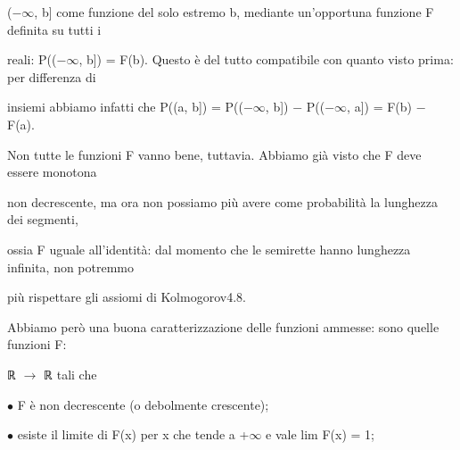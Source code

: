 \documentclass[a4paper,portrait,12pt]{article}
\begin{document}
\begin{flushleft}
($-$$\infty$, b] come funzione del solo estremo b, mediante un'opportuna funzione F definita su tutti i
\end{flushleft}


\begin{flushleft}
reali: P(($-$$\infty$, b]) = F(b). Questo \`{e} del tutto compatibile con quanto visto prima: per differenza di
\end{flushleft}


\begin{flushleft}
insiemi abbiamo infatti che P((a, b]) = P(($-$$\infty$, b]) $-$ P(($-$$\infty$, a]) = F(b) $-$ F(a).
\end{flushleft}


\begin{flushleft}
Non tutte le funzioni F vanno bene, tuttavia. Abbiamo gi\`{a} visto che F deve essere monotona
\end{flushleft}


\begin{flushleft}
non decrescente, ma ora non possiamo più avere come probabilit\`{a} la lunghezza dei segmenti,
\end{flushleft}


\begin{flushleft}
ossia F uguale all'identit\`{a}: dal momento che le semirette hanno lunghezza infinita, non potremmo
\end{flushleft}


\begin{flushleft}
più rispettare gli assiomi di Kolmogorov4.8.
\end{flushleft}


\begin{flushleft}
Abbiamo per\`{o} una buona caratterizzazione delle funzioni ammesse: sono quelle funzioni F:
\end{flushleft}


\begin{flushleft}
ℝ $\rightarrow$ ℝ tali che
\end{flushleft}


\begin{flushleft}
$\bullet$ F \`{e} non decrescente (o debolmente crescente);
\end{flushleft}


\begin{flushleft}
$\bullet$ esiste il limite di F(x) per x che tende a +$\infty$ e vale lim F(x) = 1;
\end{flushleft}
\end{document}
